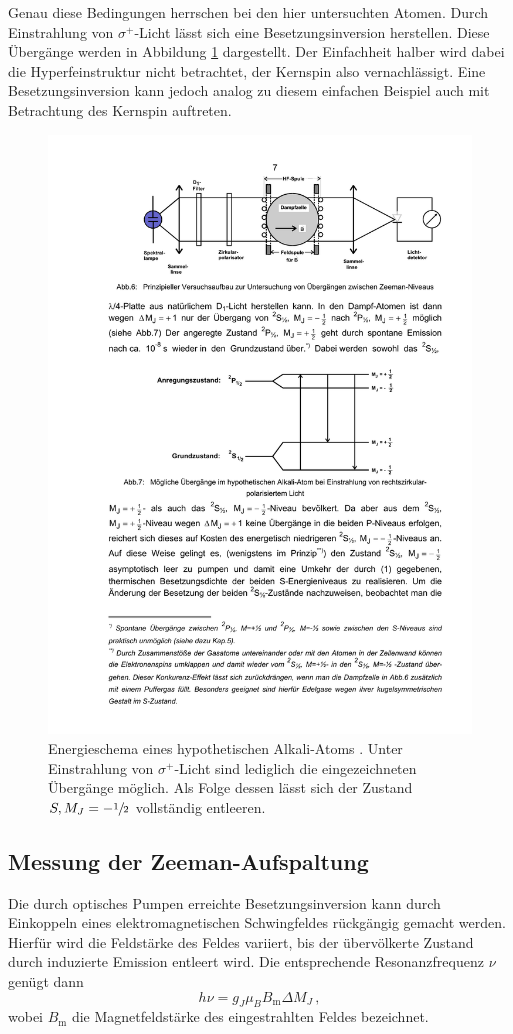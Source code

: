 Genau diese Bedingungen herrschen bei den hier untersuchten Atomen.
Durch Einstrahlung von $\sigma^+$-Licht lässt sich eine Besetzungsinversion
herstellen. Diese Übergänge werden in Abbildung \ref{fig:besetzungsinversion}
dargestellt. Der Einfachheit halber wird dabei die Hyperfeinstruktur nicht
betrachtet, der Kernspin also vernachlässigt. Eine Besetzungsinversion kann
jedoch analog zu diesem einfachen Beispiel auch mit Betrachtung des Kernspin
auftreten.
\begin{figure}
    \centering
    \includegraphics[width=0.7\linewidth]{img/besetzungsinversion}
    \caption{
        Energieschema eines hypothetischen Alkali-Atoms \cite{V21}. Unter
        Einstrahlung von $\sigma^+$-Licht sind lediglich die eingezeichneten
        Übergänge möglich.  Als Folge dessen lässt sich der Zustand $S,
        M_J=-\sfrac{1}{2}$ vollständig entleeren.
    }
    \label{fig:besetzungsinversion}
\end{figure}

\subsection{Messung der Zeeman-Aufspaltung}
\label{subsec:messung}
Die durch optisches Pumpen erreichte Besetzungsinversion kann durch Einkoppeln
eines elektromagnetischen Schwingfeldes rückgängig gemacht werden. Hierfür wird
die Feldstärke des Feldes variiert, bis der übervölkerte Zustand durch
induzierte Emission entleert wird. Die entsprechende Resonanzfrequenz $\nu$
genügt dann
\begin{equation}
\label{eq:resonanz}
    h\nu = g_J \mu_B B_\text{m} \Delta M_J\,,
\end{equation}
wobei $B_\text{m}$ die Magnetfeldstärke des eingestrahlten Feldes bezeichnet.

